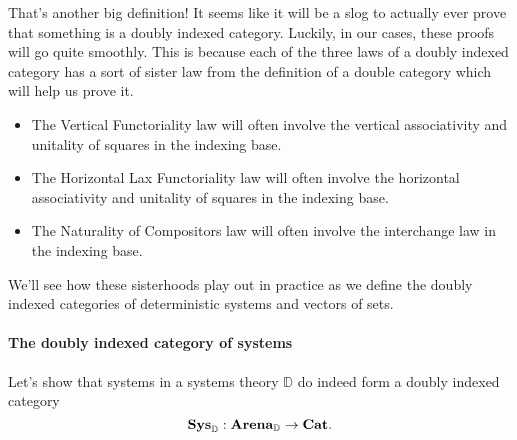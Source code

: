 \documentclass[DynamicalBook]{subfiles}
\begin{document}
That's another big definition! It seems like it will be a slog to actually ever
prove that something is a doubly indexed category. Luckily, in our cases, these
proofs will go quite smoothly. This is because each of the three laws of a
doubly indexed category has a sort of sister law from the definition of a double
category which will help us prove it.

\begin{itemize}
  \item The Vertical Functoriality law will often involve the vertical
    associativity and unitality of squares in the indexing base.
  \item The Horizontal Lax Functoriality law will often involve the horizontal
    associativity and unitality of squares in the indexing base.
  \item The Naturality of Compositors law will often involve the interchange law
    in the indexing base.
\end{itemize}

We'll see how these sisterhoods play out in practice as we define the doubly
indexed categories of deterministic systems and vectors of sets.

\paragraph{The doubly indexed category of systems}

Let's show that systems in a systems theory $\mathbb{D}$ do indeed form a doubly indexed category
$$\textbf{Sys}_{\mathbb{D}} : \textbf{Arena}_{\mathbb{D}} \to \textbf{Cat}.$$
\end{document}
